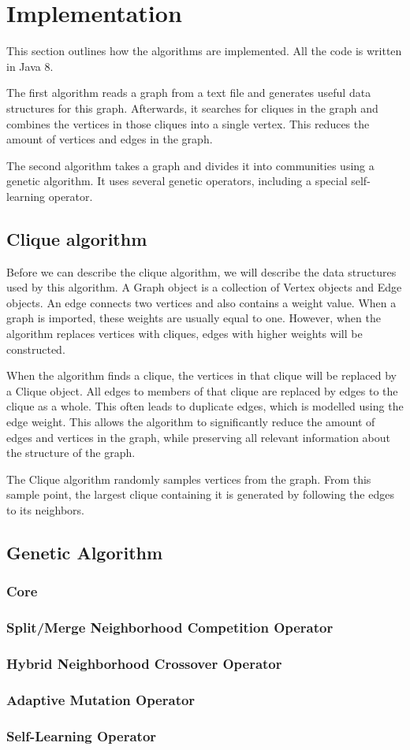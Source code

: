 \section{Implementation}
\label{chapter:implementation}
This section outlines how the algorithms are implemented. All the code is written in Java 8.
\par
 The first algorithm reads a graph from a text file and generates useful data structures for this graph. Afterwards, it searches for cliques in the graph and combines the vertices in those cliques into a single vertex. This reduces the amount of vertices and edges in the graph.
\par
The second algorithm takes a graph and divides it into communities using a genetic algorithm. It uses several genetic operators, including a special self-learning operator.
\subsection{Clique algorithm}
Before we can describe the clique algorithm, we will describe the data structures used by this algorithm. A Graph object is a collection of Vertex objects and Edge objects. An edge connects two vertices and also contains a weight value. When a graph is imported, these weights are usually equal to one. However, when the algorithm replaces vertices with cliques, edges with higher weights will be constructed. 
\par
When the algorithm finds a clique, the vertices in that clique will be replaced by a Clique object. All edges to members of that clique are replaced by edges to the clique as a whole. This often leads to duplicate edges, which is modelled using the edge weight. This allows the algorithm to significantly reduce the amount of edges and vertices in the graph, while preserving all relevant information about the structure of the graph.
\par

The Clique algorithm randomly samples vertices from the graph. From this sample point, the largest clique containing it is generated by following the edges to its neighbors.

\subsection{Genetic Algorithm}
\subsubsection{Core}
\subsubsection{Split/Merge Neighborhood Competition Operator}
\subsubsection{Hybrid Neighborhood Crossover Operator}
\subsubsection{Adaptive Mutation Operator}
\subsubsection{Self-Learning Operator}



